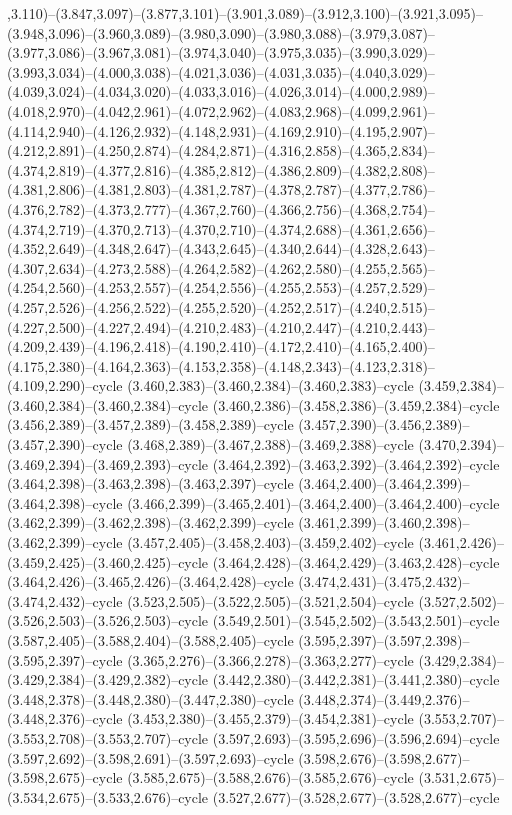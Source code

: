,3.110)--(3.847,3.097)--(3.877,3.101)--(3.901,3.089)--(3.912,3.100)--(3.921,3.095)--(3.948,3.096)--(3.960,3.089)--(3.980,3.090)--(3.980,3.088)--(3.979,3.087)--(3.977,3.086)--(3.967,3.081)--(3.974,3.040)--(3.975,3.035)--(3.990,3.029)--(3.993,3.034)--(4.000,3.038)--(4.021,3.036)--(4.031,3.035)--(4.040,3.029)--(4.039,3.024)--(4.034,3.020)--(4.033,3.016)--(4.026,3.014)--(4.000,2.989)--(4.018,2.970)--(4.042,2.961)--(4.072,2.962)--(4.083,2.968)--(4.099,2.961)--(4.114,2.940)--(4.126,2.932)--(4.148,2.931)--(4.169,2.910)--(4.195,2.907)--(4.212,2.891)--(4.250,2.874)--(4.284,2.871)--(4.316,2.858)--(4.365,2.834)--(4.374,2.819)--(4.377,2.816)--(4.385,2.812)--(4.386,2.809)--(4.382,2.808)--(4.381,2.806)--(4.381,2.803)--(4.381,2.787)--(4.378,2.787)--(4.377,2.786)--(4.376,2.782)--(4.373,2.777)--(4.367,2.760)--(4.366,2.756)--(4.368,2.754)--(4.374,2.719)--(4.370,2.713)--(4.370,2.710)--(4.374,2.688)--(4.361,2.656)--(4.352,2.649)--(4.348,2.647)--(4.343,2.645)--(4.340,2.644)--(4.328,2.643)--(4.307,2.634)--(4.273,2.588)--(4.264,2.582)--(4.262,2.580)--(4.255,2.565)--(4.254,2.560)--(4.253,2.557)--(4.254,2.556)--(4.255,2.553)--(4.257,2.529)--(4.257,2.526)--(4.256,2.522)--(4.255,2.520)--(4.252,2.517)--(4.240,2.515)--(4.227,2.500)--(4.227,2.494)--(4.210,2.483)--(4.210,2.447)--(4.210,2.443)--(4.209,2.439)--(4.196,2.418)--(4.190,2.410)--(4.172,2.410)--(4.165,2.400)--(4.175,2.380)--(4.164,2.363)--(4.153,2.358)--(4.148,2.343)--(4.123,2.318)--(4.109,2.290)--cycle (3.460,2.383)--(3.460,2.384)--(3.460,2.383)--cycle (3.459,2.384)--(3.460,2.384)--(3.460,2.384)--cycle (3.460,2.386)--(3.458,2.386)--(3.459,2.384)--cycle (3.456,2.389)--(3.457,2.389)--(3.458,2.389)--cycle (3.457,2.390)--(3.456,2.389)--(3.457,2.390)--cycle (3.468,2.389)--(3.467,2.388)--(3.469,2.388)--cycle (3.470,2.394)--(3.469,2.394)--(3.469,2.393)--cycle (3.464,2.392)--(3.463,2.392)--(3.464,2.392)--cycle (3.464,2.398)--(3.463,2.398)--(3.463,2.397)--cycle (3.464,2.400)--(3.464,2.399)--(3.464,2.398)--cycle (3.466,2.399)--(3.465,2.401)--(3.464,2.400)--(3.464,2.400)--cycle (3.462,2.399)--(3.462,2.398)--(3.462,2.399)--cycle (3.461,2.399)--(3.460,2.398)--(3.462,2.399)--cycle (3.457,2.405)--(3.458,2.403)--(3.459,2.402)--cycle (3.461,2.426)--(3.459,2.425)--(3.460,2.425)--cycle (3.464,2.428)--(3.464,2.429)--(3.463,2.428)--cycle (3.464,2.426)--(3.465,2.426)--(3.464,2.428)--cycle (3.474,2.431)--(3.475,2.432)--(3.474,2.432)--cycle (3.523,2.505)--(3.522,2.505)--(3.521,2.504)--cycle (3.527,2.502)--(3.526,2.503)--(3.526,2.503)--cycle (3.549,2.501)--(3.545,2.502)--(3.543,2.501)--cycle (3.587,2.405)--(3.588,2.404)--(3.588,2.405)--cycle (3.595,2.397)--(3.597,2.398)--(3.595,2.397)--cycle (3.365,2.276)--(3.366,2.278)--(3.363,2.277)--cycle (3.429,2.384)--(3.429,2.384)--(3.429,2.382)--cycle (3.442,2.380)--(3.442,2.381)--(3.441,2.380)--cycle (3.448,2.378)--(3.448,2.380)--(3.447,2.380)--cycle (3.448,2.374)--(3.449,2.376)--(3.448,2.376)--cycle (3.453,2.380)--(3.455,2.379)--(3.454,2.381)--cycle (3.553,2.707)--(3.553,2.708)--(3.553,2.707)--cycle (3.597,2.693)--(3.595,2.696)--(3.596,2.694)--cycle (3.597,2.692)--(3.598,2.691)--(3.597,2.693)--cycle (3.598,2.676)--(3.598,2.677)--(3.598,2.675)--cycle (3.585,2.675)--(3.588,2.676)--(3.585,2.676)--cycle (3.531,2.675)--(3.534,2.675)--(3.533,2.676)--cycle (3.527,2.677)--(3.528,2.677)--(3.528,2.677)--cycle 